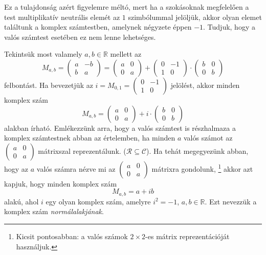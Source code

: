 \documentclass[9pt, a4paper, showtrims]{memoir}
\theoremstyle{plain}
\theoremstyle{remark}
\theoremstyle{definition}
\begin{document}
Ez a tulajdonság azért figyelemre méltó,
mert ha a szokásoknak megfelelően a test multiplikatív neutrális elemét az $1$ szimbólummal jelöljük,
akkor olyan elemet találtunk a komplex számtestben,
amelynek négyzete éppen $-1$.
Tudjuk, hogy a valós számtest esetében ez nem lenne lehetséges.

Tekintsük most valamely $a,b\in\mathbb{R}$ mellett az
\[
	M_{a,b}=
	\begin{pmatrix}
		a & -b \\
		b & a
	\end{pmatrix}
	=
	\begin{pmatrix}
		a & 0 \\
		0 & a
	\end{pmatrix}
	+
	\begin{pmatrix}
		0 & -1 \\
		1 & 0
	\end{pmatrix}
	\cdot
	\begin{pmatrix}
		b & 0 \\
		0 & b
	\end{pmatrix}
\]
felbontást.
Ha bevezetjük az
\(
i=M_{0,1}=
\begin{pmatrix}
	0 & -1 \\
	1 & 0
\end{pmatrix}
\)
jelölést, akkor minden komplex szám
\[
	M_{a,b}=
	\begin{pmatrix}
		a & 0 \\
		0 & a
	\end{pmatrix}
	+
	i
	\cdot
	\begin{pmatrix}
		b & 0 \\
		0 & b
	\end{pmatrix}
\]
alakban írható.
Emlékezzünk arra,
hogy a valós számtest is részhalmaza a komplex számtestnek abban az értelemben,
ha minden $a$ valós számot az
\begin{math}
	\begin{pmatrix}
		a & 0 \\
		0 & a
	\end{pmatrix}
\end{math}
mátrixszal reprezentálunk. ($\mathcal{R}\subseteq\mathcal{C}$).
Ha tehát megegyezünk abban, hogy az $a$ valós számra nézve mi az
\(
\begin{pmatrix}
	a & 0 \\
	0 & a
\end{pmatrix}
\)
mátrixra gondolunk,%
\footnote{Kicsit pontosabban: a valós számok $2\times 2$-es mátrix reprezentációját használjuk.}
akkor azt kapjuk, hogy minden komplex szám
\[
	M_{a,b}=a+ib
\]
alakú, ahol $i$ egy olyan komplex szám, amelyre $i^2=-1$, $a,b\in\mathbb{R}$.
Ezt nevezzük a komplex szám \emph{normálalakjának}.
\end{document}
